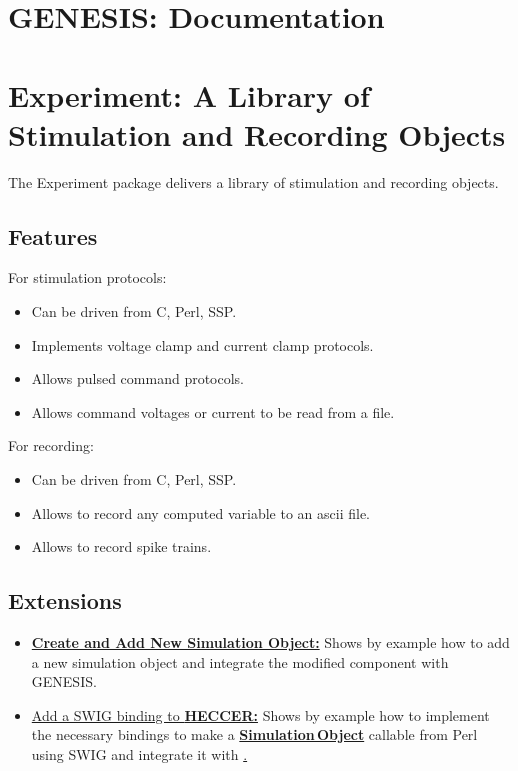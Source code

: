 \documentclass[12pt]{article}
\begin{document}
\section*{GENESIS: Documentation}

\section*{Experiment: A Library of Stimulation and Recording Objects}

The Experiment package delivers a library of stimulation and recording
objects.

\subsection*{Features}

For stimulation protocols:
\begin{itemize}
\item Can be driven from C, Perl, SSP.
\item Implements voltage clamp and current clamp protocols.
\item Allows pulsed command protocols.
\item Allows command voltages or current to be read from a file.
\end{itemize} 

For recording:
\begin{itemize}
\item Can be driven from C, Perl, SSP.
\item Allows to record any computed variable to an ascii file.
\item Allows to record spike trains.
\end{itemize} 

\subsection*{Extensions}
\begin{itemize}
\item
  \href{../genesis-add-object-solver/genesis-add-object-solver.tex}{\bf
    Create and Add New Simulation Object:} Shows by example how to add
  a new simulation object and integrate the modified component with
  GENESIS.
\item
  \href{../genesis-add-swigbinding-heccer/genesis-add-swigbinding-heccer.tex}{Add
    a SWIG binding to {\bf HECCER:}} Shows by example how to implement
  the necessary bindings to make a
  \href{../simulation-objects/simulation-objects.tex}{\bf
    Simulation\,Object} callable from Perl using SWIG and integrate it
  with \href{../ssp/ssp.tex}.
\end{itemize}
\end{document}
